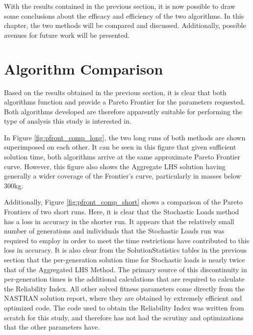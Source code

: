 With the results contained in the previous section, it is now possible to draw some conclusions about the efficacy and efficiency of the two algorithms. In this chapter, the two methods will be compared and discussed. Additionally, possible avenues for future work will be presented.  

\section{Algorithm Comparison}
Based on the results obtained in the previous section, it is clear that both algorithms function and provide a Pareto Frontier for the parameters requested. Both algorithms developed are therefore apparently suitable for performing the type of analysis this study is interested in.

In Figure \ref{fig:pfront_comp_long}, the two long runs of both methods are shown superimposed on each other. It can be seen in this figure that given sufficient solution time, both algorithms arrive at the same approximate Pareto Frontier curve. However, this figure also shows the Aggregate LHS solution having generally a wider coverage of the Frontier's curve, particularly in masses below 300kg. 

Additionally, Figure \ref{fig:pfront_comp_short} shows a comparison of the Pareto Frontiers of two short runs. Here, it is clear that the Stochastic Loads method has a loss in accuracy in the shorter run. It appears that the relatively small number of generations and individuals that the Stochastic Loads run was required to employ in order to meet the time restrictions have contributed to this loss in accuracy. It is also clear from the SolutionStatistics tables in the previous section that the per-generation solution time for Stochastic loads is nearly twice that of the Aggregated LHS Method. The primary source of this discontinuity in per-generation times is the additional calculations that are required to calculate the Reliability Index. All other solved fitness parameters come directly from the NASTRAN solution report, where they are obtained by extremely efficient and optimized code. The code used to obtain the Reliability Index was written from scratch for this study, and therefore has not had the scrutiny and optimizations that the other parameters have. 

